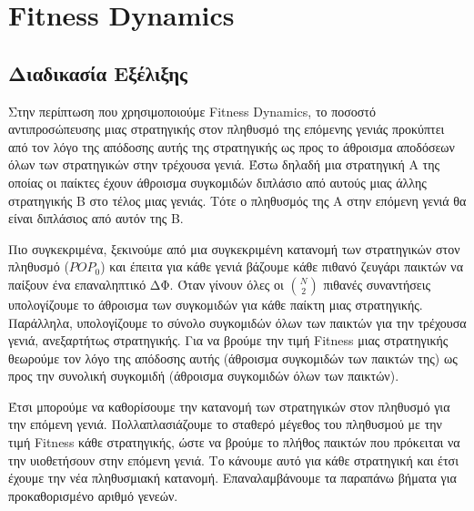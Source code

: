 \documentclass[12pt]{report}
\begin{document}
\section{\foreignlanguage{english}{Fitness Dynamics}}
\subsection{Διαδικασία Εξέλιξης}
Στην περίπτωση που χρησιμοποιούμε \foreignlanguage{english}{Fitness Dynamics}, το ποσοστό αντιπροσώπευσης μιας στρατηγικής στον πληθυσμό της επόμενης γενιάς προκύπτει από τον λόγο της απόδοσης αυτής της στρατηγικής ως προς το άθροισμα αποδόσεων όλων των στρατηγικών στην τρέχουσα γενιά. Έστω δηλαδή μια στρατηγική Α της οποίας οι παίκτες έχουν άθροισμα συγκομιδών διπλάσιο από αυτούς μιας άλλης στρατηγικής Β στο τέλος μιας γενιάς. Τότε ο πληθυσμός της Α στην επόμενη γενιά θα είναι διπλάσιος από αυτόν της Β.

Πιο συγκεκριμένα, ξεκινούμε από μια συγκεκριμένη κατανομή των στρατηγικών στον πληθυσμό ($POP_0$) και έπειτα για κάθε γενιά βάζουμε κάθε πιθανό ζευγάρι παικτών να παίξουν ένα επαναληπτικό ΔΦ. Όταν γίνουν όλες οι $\binom{N}{2}$ πιθανές συναντήσεις υπολογίζουμε το άθροισμα των συγκομιδών για κάθε παίκτη μιας στρατηγικής. Παράλληλα, υπολογίζουμε το σύνολο συγκομιδών όλων των παικτών για την τρέχουσα γενιά, ανεξαρτήτως στρατηγικής. Για να βρούμε την τιμή \foreignlanguage{english}{Fitness} μιας στρατηγικής θεωρούμε τον λόγο της απόδοσης αυτής (άθροισμα συγκομιδών των παικτών της) ως προς την συνολική συγκομιδή (άθροισμα συγκομιδών όλων των παικτών).

Έτσι μπορούμε να καθορίσουμε την κατανομή των στρατηγικών στον πληθυσμό για την επόμενη γενιά. Πολλαπλασιάζουμε το σταθερό μέγεθος του πληθυσμού με την τιμή \foreignlanguage{english}{Fitness} κάθε στρατηγικής, ώστε να βρούμε το πλήθος παικτών που πρόκειται να την υιοθετήσουν στην επόμενη γενιά. Το κάνουμε αυτό για κάθε στρατηγική και έτσι έχουμε την νέα πληθυσμιακή κατανομή. Επαναλαμβάνουμε τα παραπάνω βήματα για προκαθορισμένο αριθμό γενεών.
\end{document}
